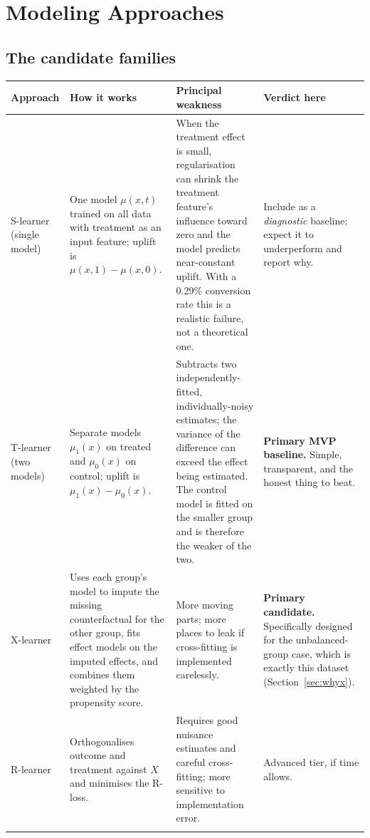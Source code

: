 \documentclass[11pt,a4paper]{article}
\begin{document}
\section{Modeling Approaches}
\label{sec:models}

\subsection{The candidate families}

\begin{longtable}{@{}L{2.7cm}L{4.5cm}L{4.3cm}L{2.9cm}@{}}
\toprule
\textbf{Approach} & \textbf{How it works} & \textbf{Principal weakness} & \textbf{Verdict here} \\
\midrule
\endhead
S-learner \newline (single model) &
One model $\mu(x,t)$ trained on all data with treatment as an input feature; uplift is
$\mu(x,1)-\mu(x,0)$. &
When the treatment effect is small, regularisation can shrink the treatment feature's influence
toward zero and the model predicts near-constant uplift. With a 0.29\% conversion rate this is a
realistic failure, not a theoretical one. &
Include as a \emph{diagnostic} baseline; expect it to underperform and report why. \\
\addlinespace
T-learner \newline (two models) &
Separate models $\mu_1(x)$ on treated and $\mu_0(x)$ on control; uplift is $\mu_1(x)-\mu_0(x)$. &
Subtracts two independently-fitted, individually-noisy estimates; the variance of the difference
can exceed the effect being estimated. The control model is fitted on the smaller group and is
therefore the weaker of the two. &
\textbf{Primary MVP baseline.} Simple, transparent, and the honest thing to beat. \\
\addlinespace
X-learner &
Uses each group's model to impute the missing counterfactual for the other group, fits effect
models on the imputed effects, and combines them weighted by the propensity score. &
More moving parts; more places to leak if cross-fitting is implemented carelessly. &
\textbf{Primary candidate.} Specifically designed for the unbalanced-group case, which is exactly
this dataset (Section~\ref{sec:whyx}). \\
\addlinespace
R-learner &
Orthogonalises outcome and treatment against $X$ and minimises the R-loss. &
Requires good nuisance estimates and careful cross-fitting; more sensitive to implementation
error. &
Advanced tier, if time allows. \\
\addlinespace

\end{longtable}
\end{document}
